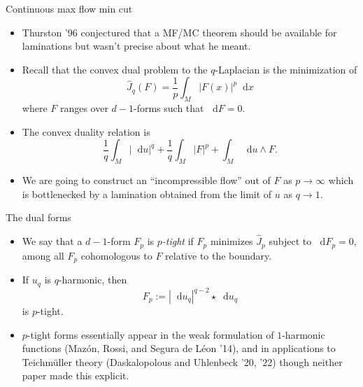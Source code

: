 \documentclass[10pt]{beamer}
\newcommand*\dif{\mathop{}\!\mathrm{d}}
\begin{document}
\begin{frame}{Continuous max flow min cut}
\begin{itemize}
\item Thurston '96 conjectured that a MF/MC theorem should be available for laminations but wasn't precise about what he meant. \pause
\item Recall that the convex dual problem to the $q$-Laplacian is the minimization of
$$\hat J_q(F) = \frac{1}{p} \int_M |F(x)|^p \dif x$$
where $F$ ranges over $d - 1$-forms such that $\dif F = 0$. \pause
\item The convex duality relation is 
$$\frac{1}{q} \int_M |\dif u|^q + \frac{1}{q} \int_M |F|^p + \int_M \dif u \wedge F.$$
\item We are going to construct an ``incompressible flow'' out of $F$ as $p \to \infty$ which is bottlenecked by a lamination obtained from the limit of $u$ as $q \to 1$.
\end{itemize}
\end{frame}

\begin{frame}{The dual forms}
\begin{itemize}
\item We say that a $d - 1$-form $F_p$ is \emph{$p$-tight} if $F_p$ minimizes $\hat J_p$ subject to $\dif F_p = 0$, among all $F_p$ cohomologous to $F$ relative to the boundary. \pause
\item If $u_q$ is $q$-harmonic, then
$$F_p := |\dif u_q|^{q - 2} \star \dif u_q$$
is $p$-tight.
\item $p$-tight forms essentially appear in the weak formulation of $1$-harmonic functions (Maz\'on, Rossi, and Segura de L\'eon '14), and in applications to Teichm\"uller theory (Daskalopolous and Uhlenbeck '20, '22) though neither paper made this explicit.
\end{itemize}
\end{frame}
\end{document}
